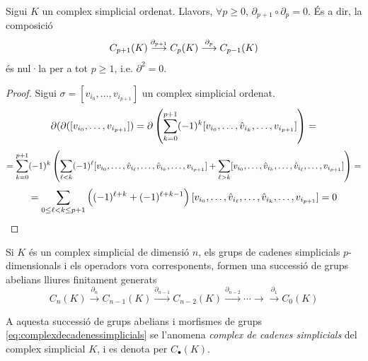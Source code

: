 \documentclass[../main.tex]{subfiles}
\begin{document}
\begin{prop}
Sigui $K$ un complex simplicial ordenat. Llavors, $\forall p\geq 0$, $\partial_{p+1}\circ\partial_p = 0$. És a dir, la composició
\begin{equation}
    \notag
    C_{p+1}(K)\overset{\partial_{p+1}}{\longrightarrow}C_p(K)\overset{\partial_p}{\longrightarrow} C_{p-1}(K)
\end{equation}
és nul·la per a tot $p\geq 1$, i.e. $\partial^2 = 0$.
\end{prop}
\begin{proof}
Sigui $\sigma = [v_{i_0},\ldots,v_{i_{p+1}}]$ un complex simplicial ordenat.
\begin{equation}
    \notag
    \partial(\partial([v_{i_0},\ldots,v_{i_{p+1}}]) = \partial\left(\sum_{k=0}^{p+1}(-1)^k[v_{i_0},\ldots,\hat{v}_{i_k},\ldots,v_{i_{p+1}}]\right) = 
\end{equation}
\begin{equation}
    \notag
    =\sum_{k=0}^{p+1}(-1)^k\left(\sum_{\ell < k}(-1)^\ell [v_{i_0},\ldots,\hat{v}_{i_\ell},\ldots,\hat{v}_{i_k},\ldots,v_{i_{p+1}}]+\sum_{\ell > k}[v_{i_0},\ldots,\hat{v}_{i_k},\ldots,\hat{v}_{i_\ell},\ldots,v_{i_{p+1}}]\right) = 
\end{equation}
\begin{equation}
    \notag
    =\sum_{0\leq \ell<k\leq p+1}\left((-1)^{\ell+k}+(-1)^{\ell+k-1}\right)[v_{i_0},\ldots,\hat{v}_{i_\ell},\ldots,\hat{v}_{i_k},\ldots,v_{i_{p+1}}] = 0
\end{equation}
\end{proof}

Si $K$ és un complex simplicial de dimensió $n$, els grups de cadenes simplicials $p$-dimensionals i els operadors vora corresponents, formen una successió de grups abelians lliures finitament generats
\begin{equation}
    \label{eq:complexdecadenessimplicials}
    C_n(K)\overset{\partial_n}{\longrightarrow}C_{n-1}(K)\overset{\partial_{n-1}}{\longrightarrow} C_{n-2}(K)\overset{\partial_{n-2}}{\longrightarrow}\cdots\longrightarrow\overset{\partial_1}{\longrightarrow}C_0(K)
\end{equation}


\begin{defi}
 A aquesta successió de grups abelians i morfismes de grups \eqref{eq:complexdecadenessimplicials} se l'anomena \textit{complex de cadenes simplicials} del complex simplicial $K$, i es denota per $C_\bullet(K)$.
\end{defi}
\end{document}
